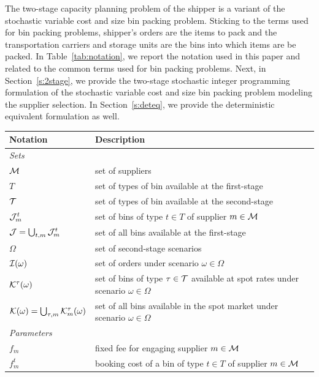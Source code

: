 \documentclass[a4paper,11pt]{article}
\begin{document}
	The two-stage capacity planning problem of the shipper is a variant of the stochastic variable cost and size bin packing problem.
	Sticking to the terms used for bin packing problems, shipper's orders are the items to pack and the transportation carriers and storage units are the bins into which items are be packed.
	In Table~\ref{tab:notation}, we report the notation used in this paper and related to the common terms used for bin packing problems.
	Next, in Section~\ref{s:2stage}, we provide the two-stage stochastic integer programming formulation of the stochastic variable cost and size bin packing problem modeling the supplier selection.
	In Section~\ref{s:deteq}, we provide the deterministic equivalent formulation as well.
	\begin{table}[!ht]
		\centering
		\begin{tabular}{p{2.5cm}p{10.5cm}}
			\hline
			{\textbf{Notation}}  &\textbf{Description}\\
			\hline
			\textit{Sets}&\\
			\hline
			$\cal M$ & set of suppliers \\%
			$T$ & set of types of bin available at the first-stage \\%
			$\cal T$ & set of types of bin available at the second-stage \\
			${\cal J}^{t}_{m}$ & set of bins of type $t \in T$ of supplier $m \in {\cal M}$ \\
			${\cal J}=\bigcup_{t,m} {\cal J}^{t}_{m}$ & set of all bins available at the first-stage \\
			$\Omega$ & set of second-stage scenarios \\ 
			${\cal I}(\omega)$ & set of orders under scenario $ \omega \in \Omega$ \\
			${\cal K}^{\tau}(\omega)$ & set of bins of type $\tau \in \cal T$ available at spot rates under scenario $ \omega \in \Omega$ \\ %
			${\cal K}(\omega) =\bigcup_{\tau, m}{\cal K}^{\tau}_m(\omega)$ & set of all bins available in the spot market under scenario $ \omega \in \Omega$ \\
			\hline	\textit{Parameters}&\\\hline
			$f_{m}$ & fixed fee for engaging supplier $m \in \cal{M}$ \\
			$f^t_m$ & booking cost of a bin of type $t \in T$ of supplier $m \in \cal{M}$ \\

\end{tabular}
\end{table}
\end{document}
